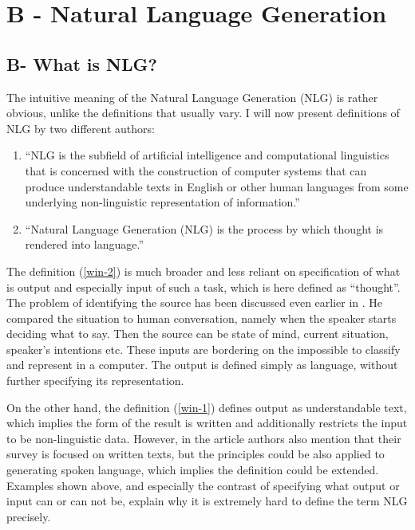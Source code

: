 \chapter{B - Natural Language Generation}\label{chap:nlg}

\section{B- What is NLG?}
The intuitive meaning of the Natural Language Generation (NLG) is rather obvious, unlike the definitions that usually vary. I will now present definitions of NLG by two different authors:
\begin{enumerate}
	\item “NLG is the subfield of artificial intelligence and computational linguistics that is concerned with the construction of computer systems that can produce understandable texts in English or other human languages from some underlying non-linguistic representation of information.”\label{win-1}\cite{reiter1997building}
	\item “Natural Language Generation (NLG) is the process by which thought is rendered into language.”\label{win-2}\cite{mcdonald2010natural}

\end{enumerate}

The definition (\ref{win-2}) is much broader and less reliant on specification of what is output and especially input of such a task, which is here defined as “thought”. The problem of identifying the source has been discussed even earlier in \cite{mcdonald1993issues}. He compared the situation to human conversation, namely when the speaker starts deciding what to say. Then the source can be state of mind, current situation, speaker’s intentions etc. These inputs are bordering on the impossible to classify and represent in a computer. The output is defined simply as language, without further specifying its representation. 

On the other hand, the definition (\ref{win-1}) defines output as understandable text, which implies the form of the result is written and additionally restricts the input to be non-linguistic data. However, in the article authors also mention that their survey is focused on written texts, but the principles could be also applied to generating spoken language, which implies the definition could be extended. Examples shown above, and especially the contrast of specifying what output or input can or can not be, explain why it is extremely hard to define the term NLG precisely.
 
